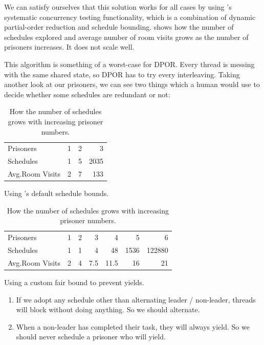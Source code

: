 We can satisfy ourselves that this solution works for all cases by
using \dejafu{}'s systematic concurrency testing functionality, which
is a combination of dynamic partial-order reduction and schedule
bounding.   shows how the number of schedules
explored and average number of room visits grows as the number of
prisoners increases.  It does not scale well.

This algorithm is something of a worst-case for DPOR.  Every thread is
messing with the same shared state, so DPOR has to try every
interleaving.  Taking another look at our prisoners, we can see two
things which a human would use to decide whether some schedules are
redundant or not:

\begin{table}
\begin{subtable}{\textwidth}
  \centering
  \begin{tabular}{lrrr} \toprule
    Prisoners          & 1 & 2 &    3 \\
    Schedules          & 1 & 5 & 2035 \\
    Avg.\@ Room Visits & 2 & 7 &  133 \\ \bottomrule
  \end{tabular}
  \caption{Using \dejafu{}'s default schedule bounds.}\label{tbl:100slow}
\end{subtable}

\vspace{2.5em}

\begin{subtable}{\textwidth}
  \centering
  \begin{tabular}{lrrrrrr} \toprule
    Prisoners          & 1 & 2 & 3   &  4   &    5 &      6 \\
    Schedules          & 1 & 1 & 4   & 48   & 1536 & 122880 \\
    Avg.\@ Room Visits & 2 & 4 & 7.5 & 11.5 &   16 &     21 \\ \bottomrule
  \end{tabular}
  \caption{Using a custom fair bound to prevent yields.}\label{tbl:100fast}
\end{subtable}
\caption{How the number of schedules grows with increasing prisoner numbers.}\label{tbl:100slowfast}
\end{table}

\begin{enumerate}
\item If we adopt any schedule other than alternating leader /
  non-leader, threads will block without doing anything.  So we should
  alternate.
\item When a non-leader has completed their task, they will always
  yield.  So we should never schedule a prisoner who will yield.
\end{enumerate}

